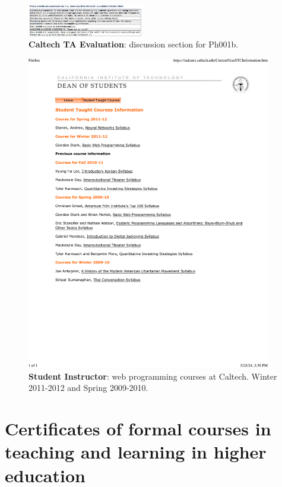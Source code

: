 \begin{figure}[h!]
  \centering
  \caption{\textbf{Caltech TA Evaluation}: discussion section for Ph001b.}
  \includegraphics[width=0.45\textwidth]{attachments/E-teaching/2010_Ph1}
\end{figure}

\begin{figure}[h!]
  \centering
  \caption{\textbf{Student Instructor}: web programming courses at Caltech. Winter 2011-2012 and Spring 2009-2010.}
  \includegraphics[width=0.95\textwidth]{attachments/E-teaching/studentTaughtCourses.htm}
\end{figure}

\section{Certificates of formal courses in teaching and learning in higher education \noneyet} \label{sec:certificates-of-formal-courses-in-teaching-and-learning-in-higher-education-noneyet}
